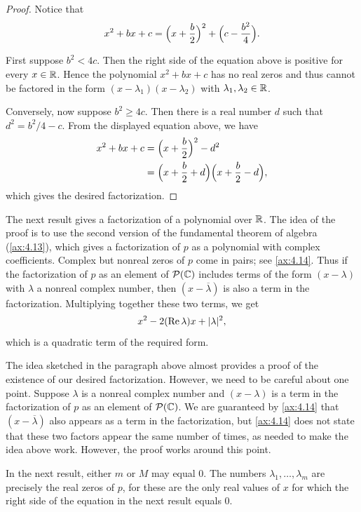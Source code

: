 \begin{proof}
Notice that
\[ x^2+bx+c = \Bigl(x+\frac{b}{2}\Bigr)^2+\Bigl(c-\frac{b^2}{4}\Bigr). \]

%
First suppose $b^2<4c$. Then the right side of the equation above is positive
for every $x\in\mathbb{R}$. Hence the polynomial $x^2+bx+c$ has no real zeros and thus
cannot be factored in the form $(x-\lambda_1)(x-\lambda_2)$ with
$\lambda_1,\lambda_2\in\mathbb{R}$.

Conversely, now suppose $b^2\ge4c$. Then there is a real number $d$ such that
$d^2=b^2/4-c$. From the displayed equation above, we have
\begin{align*}
x^2+bx+c &= \Bigl(x+\frac{b}{2}\Bigr)^2-d^2\\
  &= \Bigl(x+\frac{b}{2}+d\Bigr)\Bigl(x+\frac{b}{2}-d\Bigr),
\end{align*}
which gives the desired factorization.
\end{proof}

The next result gives a factorization of a polynomial over $\mathbb{R}$. The idea of
the proof is to use the second version of the fundamental theorem of algebra
(\ref{ax:4.13}), which gives a factorization of $p$ as a polynomial with
complex coefficients. Complex but nonreal zeros of $p$ come in pairs; see
\ref{ax:4.14}. Thus if the factorization of $p$ as an element of $\mathcal{P}(\mathbb{C})$
includes terms of the form $(x-\lambda)$ with $\lambda$ a nonreal complex
number, then $(x-\overline{\lambda})$ is also a term in the factorization.
Multiplying together these two terms, we get
\[ x^2-2(\operatorname{Re}\lambda)x+\lvert \lambda \rvert^2, \]
which is a quadratic term of the required form.

The idea sketched in the paragraph above almost provides a proof of the
existence of our desired factorization. However, we need to be careful about
one point. Suppose $\lambda$ is a nonreal complex number and $(x-\lambda)$ is a
term in the factorization of $p$ as an element of $\mathcal{P}(\mathbb{C})$. We are
guaranteed by \ref{ax:4.14} that $(x-\overline{\lambda})$ also appears as a
term in the factorization, but \ref{ax:4.14} does not state that these two
factors appear the same number of times, as needed to make the idea above work.
However, the proof works around this point.

In the next result, either $m$ or $M$ may equal $0$. The numbers
$\lambda_1,\dots,\lambda_m$ are precisely the real zeros of $p$, for these are
the only real values of $x$ for which the right side of the equation in the
next result equals $0$.

